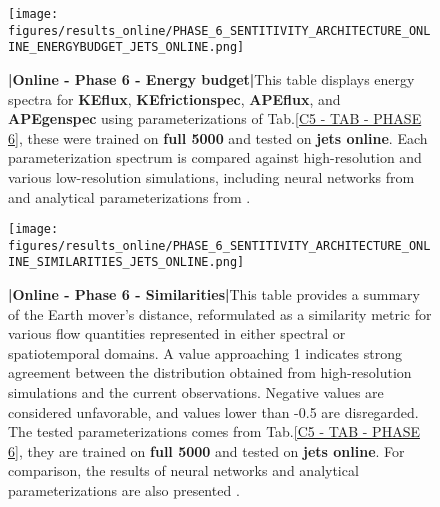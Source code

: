 \begin{figure}[H]
    \centering
    \texttt{[image: figures/results\_online/PHASE\_6\_SENTITIVITY\_ARCHITECTURE\_ONLINE\_ENERGYBUDGET\_JETS\_ONLINE.png]}
    \caption{\textbf{|}\textcolor{section_color}{\textbf{Online - Phase 6 - Energy budget}}\textbf{|}This table displays energy spectra for \textbf{KEflux}, \textbf{KEfrictionspec}, \textbf{APEflux}, and \textbf{APEgenspec} using parameterizations of Tab.\ref{C5 - TAB - PHASE 6}, these were trained on \textbf{full 5000} and tested on \textbf{jets online}. Each parameterization spectrum is compared against high-resolution and various low-resolution simulations, including neural networks from \cite{Benchmarking} and analytical parameterizations from \cite{ClosureAnalytical2, ClosureAnalytical51, ClosureDataDrivenZanna}.
}
    \label{APP - ONLINE - PHASE 6 - ENERGY BUDGET -  FULL 5000 and JETS ONLINE}
\end{figure}

%
%
\newpage

\begin{figure}[H]
    \centering
    \texttt{[image: figures/results\_online/PHASE\_6\_SENTITIVITY\_ARCHITECTURE\_ONLINE\_SIMILARITIES\_JETS\_ONLINE.png]}
    \caption{\textbf{|}\textcolor{section_color}{\textbf{Online - Phase 6 - Similarities}}\textbf{|}This table provides a summary of the Earth mover's distance, reformulated as a similarity metric for various flow quantities represented in either spectral or spatiotemporal domains. A value approaching 1 indicates strong agreement between the distribution obtained from high-resolution simulations and the current observations. Negative values are considered unfavorable, and values lower than -0.5 are disregarded. The tested parameterizations comes from Tab.\ref{C5 - TAB - PHASE 6}, they are trained on \textbf{full 5000} and tested on \textbf{jets online}. For comparison, the results of neural networks \citep{Benchmarking} and analytical parameterizations are also presented \citep{ClosureAnalytical2, ClosureAnalytical51, ClosureDataDrivenZanna}.}
    \label{APP - ONLINE - PHASE 6 - SIMILARITIES -  FULL 5000 and JETS ONLINE}
\end{figure}

%
%
\newpage

